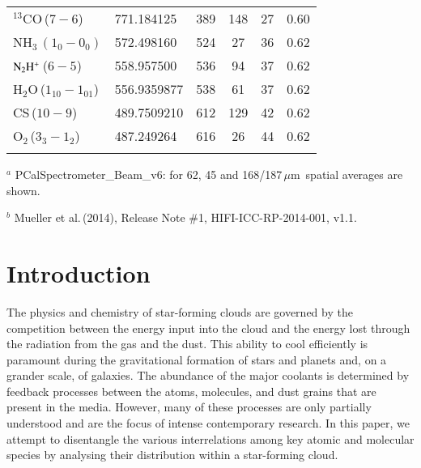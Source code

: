 \documentclass{aa}
\newcommand{\um}{$\mu$m}                                 %
\newcommand{\water}{H$_{2}$O}
\newcommand{\molo}{O$_{2}$}                     %
\newcommand{\ettnoll}{{\rm NH}$_3\,(1_0 - 0_0)$}
\newcommand{\ntwohp}{${\rm N_2H^+}$}
\begin{document}
\begin{table*}
\begin{tabular}{llcccc}
$^{13}$CO\,($7-6$)              & \phantom{1}771.184125          & 389                  & 148                     & 27                            & 0.60  \\
\ettnoll                                &  \phantom{1}572.498160        & 524                     &  \phantom{1}27        & 36                            & 0.62     \\
\ntwohp\,($6-5$)                &  \phantom{1}558.957500        & 536                   &  \phantom{1}94  & 37                            & 0.62  \\      
\water\,($1_{10}-1_{01}$) &  \phantom{1}556.9359877     & 538                   &  \phantom{1}61  & 37                            & 0.62           \\
CS\,($10-9$)                    & \phantom{1}489.7509210        & 612                   & 129                     & 42                            & 0.62  \\
\molo\,($3_3-1_2$)              & \phantom{1}487.249264         & 616                   & \phantom{1}26   & 44                            & 0.62  \\
\noalign{\smallskip}
\hline                                   
\end{tabular}
        \begin{list}{}{}
    \item[$^{a}$] PCalSpectrometer\_Beam\_v6: for 62, 45 and 168/187\,\um\ spatial averages are shown.
    \item[$^{b}$] Mueller et al.\,(2014), Release Note \#1, HIFI-ICC-RP-2014-001, v1.1.
    \end{list}
\end{table*}

%

\section{Introduction}

The physics and chemistry of star-forming clouds are governed by the competition between the energy input into the cloud and the energy lost through the radiation from the gas and the dust. This ability to cool efficiently is paramount during the gravitational formation of stars and planets and, on a grander scale, of galaxies. The abundance of the major coolants is determined by feedback processes between the atoms, molecules, and dust grains that are present in the media. However, many of these processes are only partially understood and are the focus of intense contemporary research. In this paper, we  attempt to disentangle the various interrelations among key atomic and molecular species by analysing their distribution within a star-forming cloud. 
\end{document}
